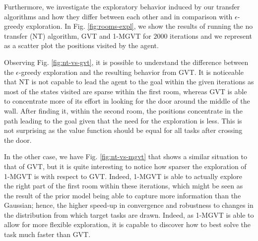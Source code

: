 \documentclass{article}
\begin{document}
Furthermore, we investigate the exploratory behavior induced by our transfer algorithms and how they differ between each other and in comparison with $\epsilon$-greedy exploration. In Fig. \ref{fig:rooms-expl}, we show the results of running the no transfer (NT) algorithm, GVT and 1-MGVT for $2000$ iterations and we represent as a scatter plot the positions visited by the agent.

Observing Fig. \ref{fig:nt-vs-gvt}, it is possible to understand the difference between the $\epsilon$-greedy exploration and the resulting behavior from GVT. It is noticeable that NT is not capable to lead the agent to the goal within the given iterations as most of the states visited are sparse within the first room, whereas GVT is able to concentrate more of its effort in looking for the door around the middle of the wall. After finding it, within the second room, the positions concentrate in the path leading to the goal given that the need for the exploration is less. This is not surprising as the value function should be equal for all tasks after crossing the door. 

In the other case, we have Fig. \ref{fig:nt-vs-mgvt} that shows a similar situation to that of GVT, but it is quite interesting to notice how sparser the exploration of 1-MGVT is with respect to GVT. Indeed, 1-MGVT is able to actually explore the right part of the first room within these iterations, which might be seen as the result of the prior model being able to capture more information than the Gaussian; hence, the higher speed-up in convergence and robustness to changes in the distribution from which target tasks are drawn. Indeed, as 1-MGVT is able to allow for more flexible exploration, it is capable to discover how to best solve the task much faster than GVT.
\end{document}
